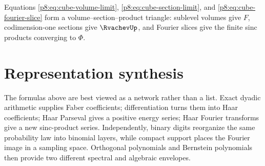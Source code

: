 \documentclass[11pt]{article}
\theoremstyle{definition}
\theoremstyle{remark}
\begin{document}
Equations \eqref{p8:eq:cube-volume-limit}, \eqref{p8:eq:cube-section-limit}, and
\eqref{p8:eq:cube-fourier-slice} form a volume--section--product triangle:
sublevel volumes give $F$, codimension-one sections give $\RvachevUp$, and Fourier
slices give the finite sinc products converging to $\Phi$.

\section{Representation synthesis}
\label{p8:sec:synthesis}

The formulas above are best viewed as a network rather than a list.  Exact
dyadic arithmetic supplies Faber coefficients; differentiation turns them
into Haar coefficients; Haar Parseval gives a positive energy series; Haar
Fourier transforms give a new sinc-product series.  Independently, binary
digits reorganize the same probability law into binomial layers, while
compact support places the Fourier image in a sampling space.  Orthogonal
polynomials and Bernstein polynomials then provide two different spectral and
algebraic envelopes.
\end{document}

